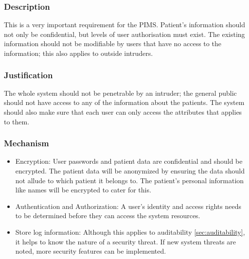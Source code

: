 \subsubsection*{Description}
This is a very important requirement for the PIMS. Patient's information should not only be confidential, but levels of user authorisation must exist. The existing information should not be modifiable by users that have no access to the information; this also applies to outside intruders.
\subsubsection*{Justification}
The whole system should not be penetrable by an intruder; the general public should not have access to any of the information about the patients. The system should also make sure that each user can only access the attributes that applies to them.
\subsubsection*{Mechanism}	
		 \begin{itemize}
		 	\item Encryption: User passwords and patient data are confidential and should be encrypted. The patient data will be anonymized by ensuring the data should not allude to which patient it belongs to. The patient's personal information like names will be encrypted to cater for this.
		 	\item Authentication and Authorization: A user's identity and access rights needs to be determined before they can access the system resources. 
		 	\item Store log information: Although this applies to auditability \ref{sec:auditability}, it helps to know the nature of a security threat. If new system threats are noted, more security features can be implemented.
		 \end{itemize}

